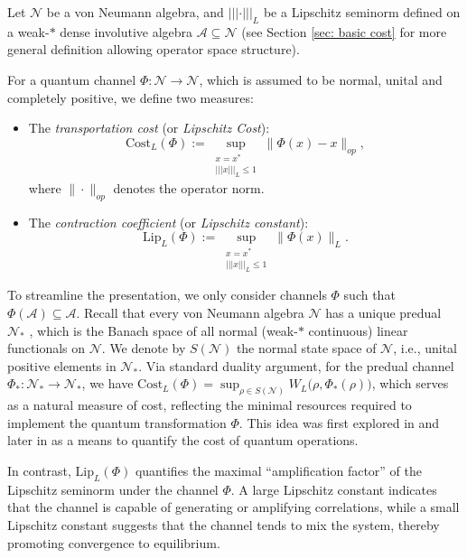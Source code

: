 \documentclass[11pt,reqno]{amsart}
\numberwithin{equation}{section}
\newcommand{\mc}{\mathcal}
\newcommand{\Lip}{\mathrm{Lip}}
\newcommand{\Cost}{\mathrm{Cost}}
\begin{document}
Let $\mc N$ be a von Neumann algebra, and $|||\cdot|||_L$ be a Lipschitz seminorm defined on a weak-$*$ dense involutive algebra $\mc A \subseteq \mc N$ (see Section \ref{sec: basic cost} for more general definition allowing operator space structure).

For a quantum channel $\Phi: \mc N \to \mc N$, which is assumed to be normal, unital and completely positive, we define two measures:
\begin{itemize}
    \item The \textit{transportation cost} (or \textit{Lipschitz Cost}):
    \begin{equation}\label{def:cost intro}
        \Cost_{L}(\Phi) := \sup_{\substack{x=x^* \\ |||x|||_L \le 1}} \|\Phi(x) - x\|_{op},
    \end{equation}
    where $\|\cdot\|_{op}$ denotes the operator norm.
    \item The \textit{contraction coefficient} (or \textit{Lipschitz constant}):
    \begin{equation}\label{def:Lipschitz constant intro}
        \Lip_L(\Phi) := \sup_{\substack{x=x^* \\ |||x|||_L \le 1}} \|\Phi(x)\|_L.
    \end{equation}
\end{itemize}
To streamline the presentation, we only consider channels $\Phi$ such that $\Phi(\mc A) \subseteq \mc A$. Recall that every von Neumann algebra $\mc N$ has a unique predual $\mc N_*$ \cite{sakai2012}, which is the Banach space of all normal (weak-$*$ continuous) linear functionals on $\mc N$. We denote by $S(\mc N)$ the normal state space of $\mc N$, i.e., unital positive elements in $\mc N_*$. Via standard duality argument, for the predual channel $\Phi_* : \mc N_* \to \mc N_*$, we have $\Cost_{L}(\Phi)= \sup_{\rho \in S(\mc N)} W_L\big(\rho,\Phi_*(\rho)\big)$, which serves as a natural measure of cost, reflecting the minimal resources required to implement the quantum transformation $\Phi$. This idea was first explored in \cite{PMTL,LBKJL} and later in \cite{araiza2023} as a means to quantify the cost of quantum operations.

In contrast, $\Lip_L(\Phi)$ quantifies the maximal “amplification factor” of the Lipschitz seminorm under the channel $\Phi$. A large Lipschitz constant indicates that the channel is capable of generating or amplifying correlations, while a small Lipschitz constant suggests that the channel tends to mix the system, thereby promoting convergence to equilibrium.
\end{document}
